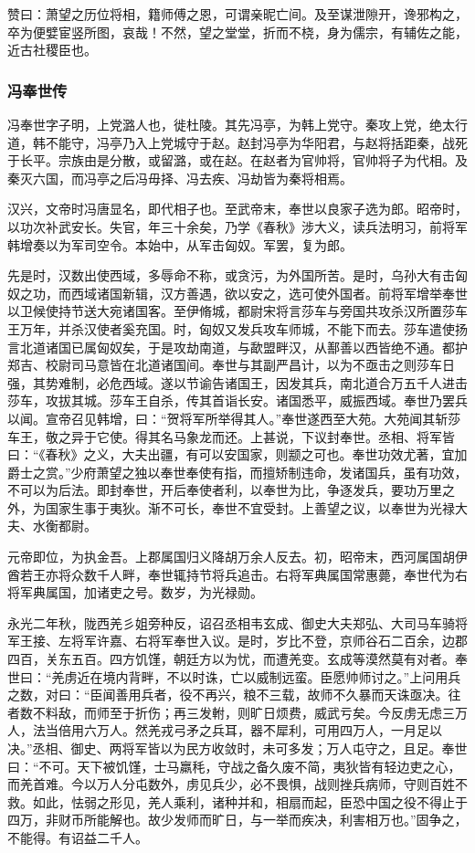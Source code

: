 \documentclass[]{article}
\begin{document}
赞曰：萧望之历位将相，籍师傅之恩，可谓亲昵亡间。及至谋泄隙开，谗邪构之，卒为便嬖宦竖所图，哀哉！不然，望之堂堂，折而不桡，身为儒宗，有辅佐之能，近古社稷臣也。

\hypertarget{header-n5543}{%
\subsubsection{冯奉世传}\label{header-n5543}}

冯奉世字子明，上党潞人也，徙杜陵。其先冯亭，为韩上党守。秦攻上党，绝太行道，韩不能守，冯亭乃入上党城守于赵。赵封冯亭为华阳君，与赵将括距秦，战死于长平。宗族由是分散，或留潞，或在赵。在赵者为官帅将，官帅将子为代相。及秦灭六国，而冯亭之后冯毋择、冯去疾、冯劫皆为秦将相焉。

汉兴，文帝时冯唐显名，即代相子也。至武帝末，奉世以良家子选为郎。昭帝时，以功次补武安长。失官，年三十余矣，乃学《春秋》涉大义，读兵法明习，前将军韩增奏以为军司空令。本始中，从军击匈奴。军罢，复为郎。

先是时，汉数出使西域，多辱命不称，或贪污，为外国所苦。是时，乌孙大有击匈奴之功，而西域诸国新辑，汉方善遇，欲以安之，选可使外国者。前将军增举奉世以卫候使持节送大宛诸国客。至伊脩城，都尉宋将言莎车与旁国共攻杀汉所置莎车王万年，并杀汉使者奚充国。时，匈奴又发兵攻车师城，不能下而去。莎车遣使扬言北道诸国已属匈奴矣，于是攻劫南道，与歃盟畔汉，从鄯善以西皆绝不通。都护郑吉、校尉司马意皆在北道诸国间。奉世与其副严昌计，以为不亟击之则莎车日强，其势难制，必危西域。遂以节谕告诸国王，因发其兵，南北道合万五千人进击莎车，攻拔其城。莎车王自杀，传其首诣长安。诸国悉平，威振西域。奉世乃罢兵以闻。宣帝召见韩增，曰：``贺将军所举得其人。''奉世遂西至大苑。大苑闻其斩莎车王，敬之异于它使。得其名马象龙而还。上甚说，下议封奉世。丞相、将军皆曰：``《春秋》之义，大夫出疆，有可以安国家，则颛之可也。奉世功效尤著，宜加爵士之赏。''少府萧望之独以奉世奉使有指，而擅矫制违命，发诸国兵，虽有功效，不可以为后法。即封奉世，开后奉使者利，以奉世为比，争逐发兵，要功万里之外，为国家生事于夷狄。渐不可长，奉世不宜受封。上善望之议，以奉世为光禄大夫、水衡都尉。

元帝即位，为执金吾。上郡属国归义降胡万余人反去。初，昭帝末，西河属国胡伊酋若王亦将众数千人畔，奉世辄持节将兵追击。右将军典属国常惠薨，奉世代为右将军典属国，加诸吏之号。数岁，为光禄勋。

永光二年秋，陇西羌彡姐旁种反，诏召丞相韦玄成、御史大夫郑弘、大司马车骑将军王接、左将军许嘉、右将军奉世入议。是时，岁比不登，京师谷石二百余，边郡四百，关东五百。四方饥馑，朝廷方以为忧，而遭羌变。玄成等漠然莫有对者。奉世曰：``羌虏近在境内背畔，不以时诛，亡以威制远蛮。臣愿帅师讨之。''上问用兵之数，对曰：``臣闻善用兵者，役不再兴，粮不三载，故师不久暴而天诛亟决。往者数不料敌，而师至于折伤；再三发軵，则旷日烦费，威武亏矣。今反虏无虑三万人，法当倍用六万人。然羌戎弓矛之兵耳，器不犀利，可用四万人，一月足以决。''丞相、御史、两将军皆以为民方收敛时，未可多发；万人屯守之，且足。奉世曰：``不可。天下被饥馑，士马羸秏，守战之备久废不简，夷狄皆有轻边吏之心，而羌首难。今以万人分屯数外，虏见兵少，必不畏惧，战则挫兵病师，守则百姓不救。如此，怯弱之形见，羌人乘利，诸种并和，相扇而起，臣恐中国之役不得止于四万，非财币所能解也。故少发师而旷日，与一举而疾决，利害相万也。''固争之，不能得。有诏益二千人。
\end{document}
